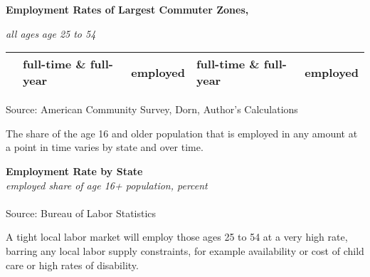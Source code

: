 \documentclass{report}
\newcommand{\tbllink}[1]{\href{https://raw.githubusercontent.com/bdecon/US-chartbook/master/chartbook/data/#1}{\faTable}}
\begin{document}
{\begin{minipage}{0.24\textwidth}
\footnotesize 
\end{minipage}
\newpage
\begin{minipage}{0.76\textwidth} 
\normalsize \textbf{Employment Rates of Largest Commuter Zones, }
\vspace{-1mm}

\footnotesize \hspace{42mm} \textit{all ages} \hspace{20mm} \textit{age 25 to 54}\\
 \setlength{\tabcolsep}{3.1pt} \color{black!90}
	{\renewcommand{\arraystretch}{1.55}
		\begin{tabular}{p{24mm} R{15mm} R{15mm} R{15mm} R{15mm}}
		 	& full-time \& full-year & employed & full-time \& full-year & employed \\
			  \hline
		\end{tabular}}	
\vspace{-2mm}

\footnotesize{Source: American Community Survey, Dorn, Author's Calculations}
\vspace{6mm}

\small The share of the age 16 and older population that is employed in any amount at a point in time varies by state and over time. 
\end{minipage}
\vspace{2mm}

\normalsize \textbf{Employment Rate by State}\\
\footnotesize{\textit{employed share of age 16+ population, percent}}\\
\vspace{-2mm}
\hspace{-8mm}  \\
\footnotesize{Source: Bureau of Labor Statistics} \hspace{72mm} \tbllink{state_epop.csv}
\newpage
\begin{minipage}{0.76\textwidth}  
\vspace*{-6mm}

\small A tight local labor market will employ those ages 25 to 54 at a very high rate, barring any local labor supply constraints, for example availability or cost of child care or high rates of disability. 


\end{minipage}}
\end{document}

